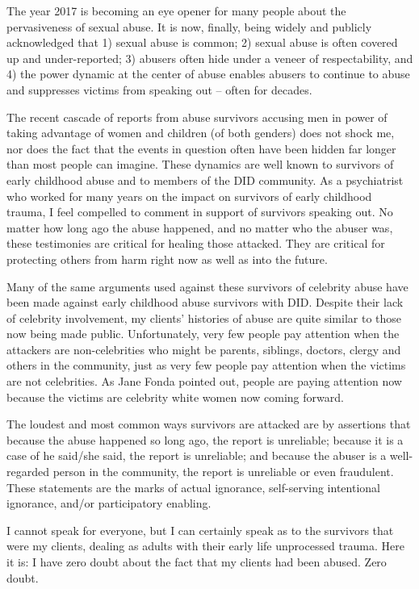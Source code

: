 \documentclass[]{book}
\begin{document}
The year 2017 is becoming an eye opener for many people about the pervasiveness of sexual abuse. It is now, finally, being widely and publicly acknowledged that 1) sexual abuse is common; 2) sexual abuse is often covered up and under-reported; 3) abusers often hide under a veneer of respectability, and 4) the power dynamic at the center of abuse enables abusers to continue to abuse and suppresses victims from speaking out -- often for decades.

The recent cascade of reports from abuse survivors accusing men in power of taking advantage of women and children (of both genders) does not shock me, nor does the fact that the events in question often have been hidden far longer than most people can imagine. These dynamics are well known to survivors of early childhood abuse and to members of the DID community. As a psychiatrist who worked for many years on the impact on survivors of early childhood trauma, I feel compelled to comment in support of survivors speaking out. No matter how long ago the abuse happened, and no matter who the abuser was, these testimonies are critical for healing those attacked. They are critical for protecting others from harm right now as well as into the future.

Many of the same arguments used against these survivors of celebrity abuse have been made against early childhood abuse survivors with DID. Despite their lack of celebrity involvement, my clients' histories of abuse are quite similar to those now being made public. Unfortunately, very few people pay attention when the attackers are non-celebrities who might be parents, siblings, doctors, clergy and others in the community, just as very few people pay attention when the victims are not celebrities. As Jane Fonda pointed out, people are paying attention now because the victims are celebrity white women now coming forward.

The loudest and most common ways survivors are attacked are by assertions that because the abuse happened so long ago, the report is unreliable; because it is a case of he said/she said, the report is unreliable; and because the abuser is a well-regarded person in the community, the report is unreliable or even fraudulent. These statements are the marks of actual ignorance, self-serving intentional ignorance, and/or participatory enabling.

I cannot speak for everyone, but I can certainly speak as to the survivors that were my clients, dealing as adults with their early life unprocessed trauma. Here it is: I have zero doubt about the fact that my clients had been abused. Zero doubt.
\end{document}
